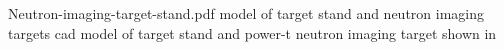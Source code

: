 \documentclass[../main.tex]{subfiles}%
\begin{document}
%
    \Xsupplement%
    \begin{supplement}%
        \supplementcaption%
            {Neutron-imaging-target-stand.pdf}%
            { model of target stand and neutron imaging targets}%
            {\Gls{cad} model of target stand and \gls{power-t} neutron imaging target shown in }%
        \label{sup:neutron-imaging-target-stand}%
    \end{supplement}%
\end{document}
